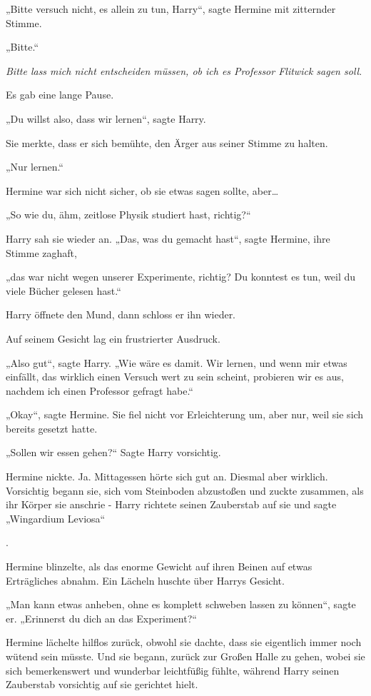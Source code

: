 {„Bitte versuch nicht, es allein zu tun, Harry“, sagte Hermine mit zitternder Stimme.

„Bitte.“

\emph{Bitte lass mich nicht entscheiden müssen, ob ich es Professor Flitwick sagen soll}.

Es gab eine lange Pause.

„Du willst also, dass wir lernen“, sagte Harry.

Sie merkte, dass er sich bemühte, den Ärger aus seiner Stimme zu halten.

„Nur lernen.“

Hermine war sich nicht sicher, ob sie etwas sagen sollte, aber…

„So wie du, ähm, zeitlose Physik studiert hast, richtig?“

Harry sah sie wieder an. „Das, was du gemacht hast“, sagte Hermine, ihre Stimme zaghaft,

„das war nicht wegen unserer Experimente, richtig? Du konntest es tun, weil du viele Bücher gelesen hast.“

Harry öffnete den Mund, dann schloss er ihn wieder.

Auf seinem Gesicht lag ein frustrierter Ausdruck.

„Also gut“, sagte Harry. „Wie wäre es damit. Wir lernen, und wenn mir etwas einfällt, das wirklich einen Versuch wert zu sein scheint, probieren wir es aus, nachdem ich einen Professor gefragt habe.“

„Okay“, sagte Hermine. Sie fiel nicht vor Erleichterung um, aber nur, weil sie sich bereits gesetzt hatte.

„Sollen wir essen gehen?“ Sagte Harry vorsichtig.

Hermine nickte. Ja. Mittagessen hörte sich gut an. Diesmal aber wirklich. Vorsichtig begann sie, sich vom Steinboden abzustoßen und zuckte zusammen, als ihr Körper sie anschrie - Harry richtete seinen Zauberstab auf sie und sagte „Wingardium Leviosa“

.

Hermine blinzelte, als das enorme Gewicht auf ihren Beinen auf etwas Erträgliches abnahm. Ein Lächeln huschte über Harrys Gesicht.

„Man kann etwas anheben, ohne es komplett schweben lassen zu können“, sagte er. „Erinnerst du dich an das Experiment?“

Hermine lächelte hilflos zurück, obwohl sie dachte, dass sie eigentlich immer noch wütend sein müsste. Und sie begann, zurück zur Großen Halle zu gehen, wobei sie sich bemerkenswert und wunderbar leichtfüßig fühlte, während Harry seinen Zauberstab vorsichtig auf sie gerichtet hielt.

}
